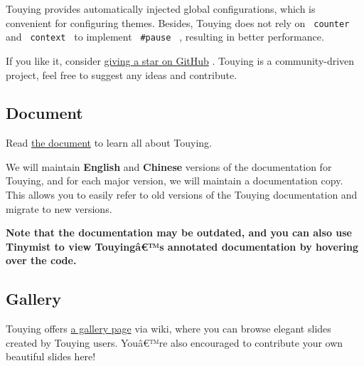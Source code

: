 Touying provides automatically injected global configurations, which is
convenient for configuring themes. Besides, Touying does not rely on
\texttt{\ counter\ } and \texttt{\ context\ } to implement
\texttt{\ \#pause\ } , resulting in better performance.

If you like it, consider
\href{https://github.com/touying-typ/touying}{giving a star on GitHub} .
Touying is a community-driven project, feel free to suggest any ideas
and contribute.

\href{https://touying-typ.github.io/}{}
\href{https://github.com/touying-typ/touying/wiki}{}

\subsection{Document}\label{document}

Read \href{https://touying-typ.github.io/}{the document} to learn all
about Touying.

We will maintain \textbf{English} and \textbf{Chinese} versions of the
documentation for Touying, and for each major version, we will maintain
a documentation copy. This allows you to easily refer to old versions of
the Touying documentation and migrate to new versions.

\textbf{Note that the documentation may be outdated, and you can also
use Tinymist to view Touyingâ€™s annotated documentation by hovering
over the code.}

\subsection{Gallery}\label{gallery}

Touying offers \href{https://github.com/touying-typ/touying/wiki}{a
gallery page} via wiki, where you can browse elegant slides created by
Touying users. Youâ€™re also encouraged to contribute your own beautiful
slides here!

